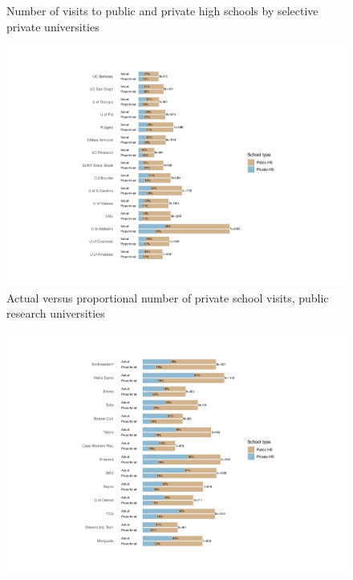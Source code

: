 \documentclass[
  12pt,
]{article}
\begin{document}
\begin{landscape}
\begin{figure}
{}

\caption{Number of visits to public and private high schools by selective private universities}\label{fig:events-hs-count-privu}
\end{figure}

\newpage

\begin{figure}

{\centering \includegraphics[width=2\linewidth]{./events_hs_actual_proportional_pubu} 

}

\caption{Actual versus proportional number of private school visits, public research universities}\label{fig:actual-proportional-pubu}
\end{figure}

\clearpage

\begin{figure}

{\centering \includegraphics[width=2\linewidth]{./events_hs_actual_proportional_privu} 

}
\end{figure}
\end{landscape}
\end{document}
